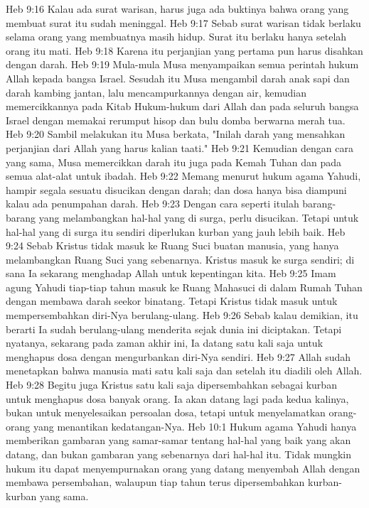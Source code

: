 Heb 9:16  Kalau ada surat warisan, harus juga ada buktinya bahwa orang yang membuat surat itu sudah meninggal.
Heb 9:17  Sebab surat warisan tidak berlaku selama orang yang membuatnya masih hidup. Surat itu berlaku hanya setelah orang itu mati.
Heb 9:18  Karena itu perjanjian yang pertama pun harus disahkan dengan darah.
Heb 9:19  Mula-mula Musa menyampaikan semua perintah hukum Allah kepada bangsa Israel. Sesudah itu Musa mengambil darah anak sapi dan darah kambing jantan, lalu mencampurkannya dengan air, kemudian memercikkannya pada Kitab Hukum-hukum dari Allah dan pada seluruh bangsa Israel dengan memakai rerumput hisop dan bulu domba berwarna merah tua.
Heb 9:20  Sambil melakukan itu Musa berkata, "Inilah darah yang mensahkan perjanjian dari Allah yang harus kalian taati."
Heb 9:21  Kemudian dengan cara yang sama, Musa memercikkan darah itu juga pada Kemah Tuhan dan pada semua alat-alat untuk ibadah.
Heb 9:22  Memang menurut hukum agama Yahudi, hampir segala sesuatu disucikan dengan darah; dan dosa hanya bisa diampuni kalau ada penumpahan darah.
Heb 9:23  Dengan cara seperti itulah barang-barang yang melambangkan hal-hal yang di surga, perlu disucikan. Tetapi untuk hal-hal yang di surga itu sendiri diperlukan kurban yang jauh lebih baik.
Heb 9:24  Sebab Kristus tidak masuk ke Ruang Suci buatan manusia, yang hanya melambangkan Ruang Suci yang sebenarnya. Kristus masuk ke surga sendiri; di sana Ia sekarang menghadap Allah untuk kepentingan kita.
Heb 9:25  Imam agung Yahudi tiap-tiap tahun masuk ke Ruang Mahasuci di dalam Rumah Tuhan dengan membawa darah seekor binatang. Tetapi Kristus tidak masuk untuk mempersembahkan diri-Nya berulang-ulang.
Heb 9:26  Sebab kalau demikian, itu berarti Ia sudah berulang-ulang menderita sejak dunia ini diciptakan. Tetapi nyatanya, sekarang pada zaman akhir ini, Ia datang satu kali saja untuk menghapus dosa dengan mengurbankan diri-Nya sendiri.
Heb 9:27  Allah sudah menetapkan bahwa manusia mati satu kali saja dan setelah itu diadili oleh Allah.
Heb 9:28  Begitu juga Kristus satu kali saja dipersembahkan sebagai kurban untuk menghapus dosa banyak orang. Ia akan datang lagi pada kedua kalinya, bukan untuk menyelesaikan persoalan dosa, tetapi untuk menyelamatkan orang-orang yang menantikan kedatangan-Nya.
Heb 10:1  Hukum agama Yahudi hanya memberikan gambaran yang samar-samar tentang hal-hal yang baik yang akan datang, dan bukan gambaran yang sebenarnya dari hal-hal itu. Tidak mungkin hukum itu dapat menyempurnakan orang yang datang menyembah Allah dengan membawa persembahan, walaupun tiap tahun terus dipersembahkan kurban-kurban yang sama.
